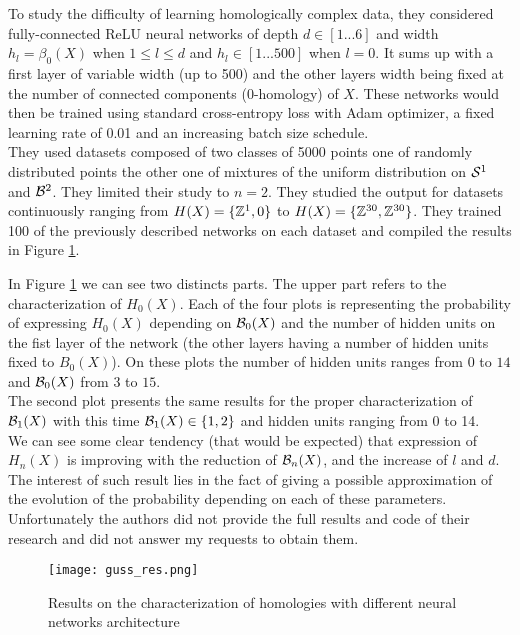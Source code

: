 \documentclass[12pt, a4paper]{article}
\begin{document}
To study the difficulty of learning homologically complex data, they considered fully-connected ReLU neural networks of depth $d \in [1 ... 6]$ and width $h_l = \beta_0(X)$ when $1 \le l \le d$ and $h_l \in [1 ... 500]$ when $l = 0$. It sums up with a first layer of variable width (up to 500) and the other layers width being fixed at the number of connected components (0-homology) of $X$. These networks would then be trained using standard cross-entropy loss with Adam optimizer, a fixed learning rate of 0.01 and an increasing batch size schedule.\\

They used datasets composed of two classes of 5000 points one of randomly distributed points the other one of mixtures of the uniform distribution on $\S^1$ and $\B^2$. They limited their study to $n=2$. They studied the output for datasets continuously ranging from $H(X) = \{\Z^1, 0\}$ to $H(X) = \{\Z^{30}, \Z^{30}\}$. They trained 100 of the previously described networks on each dataset and compiled the results in Figure \ref{fig:guss_results}.


In Figure \ref{fig:guss_results} we can see two distincts parts. The upper part refers to the characterization of $H_0(X)$. Each of the four plots is representing the probability of expressing $H_0(X)$ depending on $\B_0(X)$ and the number of hidden units on the fist layer of the network (the other layers having a number of hidden units fixed to $B_0(X)$). On these plots the number of hidden units ranges from $0$ to $14$ and $\B_0(X)$ from $3$ to $15$.\\

The second plot presents the same results for the proper characterization of $\B_1(X)$ with this time $\B_1(X) \in \{1,2\}$ and hidden units ranging from $0$ to 14.\\

We can see some clear tendency (that would be expected) that expression of $H_n(X)$ is improving with the reduction of $\B_n(X)$, and the increase of $l$ and $d$. The interest of such result lies in the fact of giving a possible approximation of the evolution of the probability depending on each of these parameters.\\

Unfortunately the authors did not provide the full results and code of their research and did not answer my requests to obtain them.

\begin{figure}[H]
  \centering
  \texttt{[image: guss\_res.png]}
  \caption{Results on the characterization of homologies with different neural networks architecture}
  \label{fig:guss_results}
  
\end{figure}
\newpage
\end{document}
